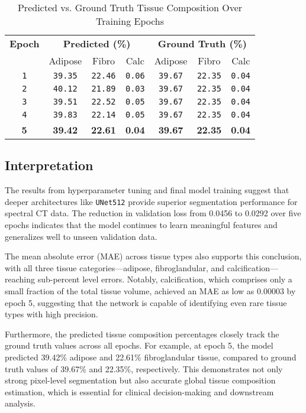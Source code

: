 \begin{table}[h!]
\centering
\caption{Predicted vs. Ground Truth Tissue Composition Over Training Epochs}
\label{tab:tissue_prediction}
\begin{tabular}{|c|ccc|ccc|}
\hline
\textbf{Epoch} & \multicolumn{3}{c|}{\textbf{Predicted (\%)}} & \multicolumn{3}{c|}{\textbf{Ground Truth (\%)}} \\
               & Adipose & Fibro & Calc & Adipose & Fibro & Calc \\
\hline
\texttt{1} & \texttt{39.35} & \texttt{22.46} & \texttt{0.06} & \texttt{39.67} & \texttt{22.35} & \texttt{0.04} \\
\texttt{2} & \texttt{40.12} & \texttt{21.89} & \texttt{0.03} & \texttt{39.67} & \texttt{22.35} & \texttt{0.04} \\
\texttt{3} & \texttt{39.51} & \texttt{22.52} & \texttt{0.05} & \texttt{39.67} & \texttt{22.35} & \texttt{0.04} \\
\texttt{4} & \texttt{39.83} & \texttt{22.14} & \texttt{0.05} & \texttt{39.67} & \texttt{22.35} & \texttt{0.04} \\
\textbf{5} & \textbf{39.42} & \textbf{22.61} & \textbf{0.04} & \textbf{39.67} & \textbf{22.35} & \textbf{0.04} \\
\hline
\end{tabular}
\end{table}

\subsection{Interpretation}

The results from hyperparameter tuning and final model training suggest that deeper architectures like \texttt{UNet512} 
provide superior segmentation performance for spectral CT data. The reduction in validation loss from 0.0456 to 0.0292 
over five epochs indicates that the model continues to learn meaningful features and generalizes well to unseen validation 
data.

The mean absolute error (MAE) across tissue types also supports this conclusion, with all three tissue categories—adipose, 
fibroglandular, and calcification—reaching sub-percent level errors. Notably, calcification, which comprises only a small 
fraction of the total tissue volume, achieved an MAE as low as 0.00003 by epoch 5, suggesting that the network is capable 
of identifying even rare tissue types with high precision.

Furthermore, the predicted tissue composition percentages closely track the ground truth values across all epochs. For 
example, at epoch 5, the model predicted 39.42\% adipose and 22.61\% fibroglandular tissue, compared to ground truth 
values of 39.67\% and 22.35\%, respectively. This demonstrates not only strong pixel-level segmentation but also accurate 
global tissue composition estimation, which is essential for clinical decision-making and downstream analysis.

